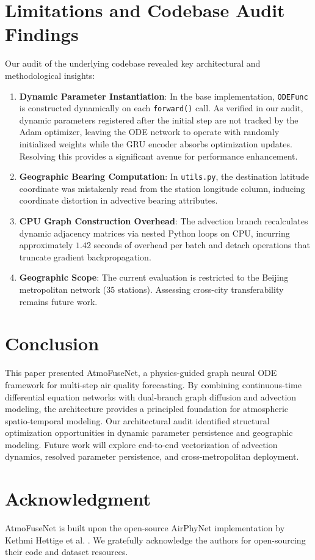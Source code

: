 \documentclass[conference]{IEEEtran}
\begin{document}
\section{Limitations and Codebase Audit Findings}
Our audit of the underlying codebase revealed key architectural and methodological insights:
\begin{enumerate}
    \item \textbf{Dynamic Parameter Instantiation}: In the base implementation, \texttt{ODEFunc} is constructed dynamically on each \texttt{forward()} call. As verified in our audit, dynamic parameters registered after the initial step are not tracked by the Adam optimizer, leaving the ODE network to operate with randomly initialized weights while the GRU encoder absorbs optimization updates. Resolving this provides a significant avenue for performance enhancement.
    \item \textbf{Geographic Bearing Computation}: In \texttt{utils.py}, the destination latitude coordinate was mistakenly read from the station longitude column, inducing coordinate distortion in advective bearing attributes.
    \item \textbf{CPU Graph Construction Overhead}: The advection branch recalculates dynamic adjacency matrices via nested Python loops on CPU, incurring approximately $1.42$ seconds of overhead per batch and detach operations that truncate gradient backpropagation.
    \item \textbf{Geographic Scope}: The current evaluation is restricted to the Beijing metropolitan network (35 stations). Assessing cross-city transferability remains future work.
\end{enumerate}

\section{Conclusion}
This paper presented AtmoFuseNet, a physics-guided graph neural ODE framework for multi-step air quality forecasting. By combining continuous-time differential equation networks with dual-branch graph diffusion and advection modeling, the architecture provides a principled foundation for atmospheric spatio-temporal modeling. Our architectural audit identified structural optimization opportunities in dynamic parameter persistence and geographic modeling. Future work will explore end-to-end vectorization of advection dynamics, resolved parameter persistence, and cross-metropolitan deployment.

\section*{Acknowledgment}
AtmoFuseNet is built upon the open-source AirPhyNet implementation by Kethmi Hettige et al. \cite{hettige2024airphynet}. We gratefully acknowledge the authors for open-sourcing their code and dataset resources.



\end{document}
